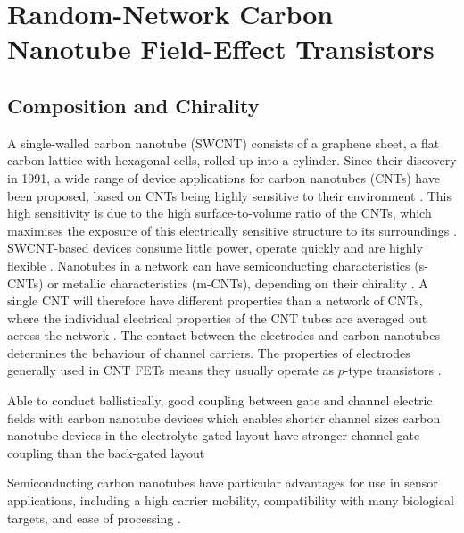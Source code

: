 \documentclass[
  a4paper,
]{scrbook}
\begin{document}
\hypertarget{random-network-carbon-nanotube-field-effect-transistors}{%
\section{Random-Network Carbon Nanotube Field-Effect
Transistors}\label{random-network-carbon-nanotube-field-effect-transistors}}

\hypertarget{composition-and-chirality}{%
\subsection{Composition and Chirality}\label{composition-and-chirality}}

A single-walled carbon nanotube (SWCNT) consists of a graphene sheet, a
flat carbon lattice with hexagonal cells, rolled up into a cylinder.
Since their discovery in 1991, a wide range of device applications for
carbon nanotubes (CNTs) have been proposed, based on CNTs being highly
sensitive to their environment \autocite{Iijima1991,Dekker1999}. This
high sensitivity is due to the high surface-to-volume ratio of the CNTs,
which maximises the exposure of this electrically sensitive structure to
its surroundings \autocite{Yao2021,Shkodra2021}. SWCNT-based devices
consume little power, operate quickly and are highly flexible
\autocite{Shkodra2021}. Nanotubes in a network can have semiconducting
characteristics (s-CNTs) or metallic characteristics (m-CNTs), depending
on their chirality \autocite{Martel1998,Kong2000}. A single CNT will
therefore have different properties than a network of CNTs, where the
individual electrical properties of the CNT tubes are averaged out
across the network \autocite{Battie2010}. The contact between the
electrodes and carbon nanotubes determines the behaviour of channel
carriers. The properties of electrodes generally used in CNT FETs means
they usually operate as \(p\)-type transistors \autocite{Yao2021}.

Able to conduct ballistically, good coupling between gate and channel
electric fields with carbon nanotube devices which enables shorter
channel sizes \autocite{Avouris2007} carbon nanotube devices in the
electrolyte-gated layout have stronger channel-gate coupling than the
back-gated layout \autocite{Heller2009a}

Semiconducting carbon nanotubes have particular advantages for use in
sensor applications, including a high carrier mobility, compatibility
with many biological targets, and ease of processing
\autocite{Shkodra2021}.
\end{document}
